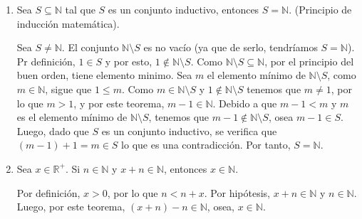 \documentclass[11pt]{article}
\newcommand{\N}{\mathbb{N}}
\newcommand{\R}{\mathbb{R}}
\let\subset\subseteq
\begin{document}
\begin{enumerate}[label=\alph*)]
\begin{enumerate}[label=\roman*)]

  \item Sea $S\subseteq \N$ tal que $S$ es un conjunto inductivo, entonces $S=\N$. (Principio de inducción matemática).

   Sea $S\neq \N$. El conjunto $\N\setminus S$ es no vacío (ya que de serlo, tendríamos $S=\N$). Pr definición, $1\in S$ y por esto, $1\notin \N\setminus S$. Como $\N\setminus S\subset \N$, por el principio del buen orden, tiene elemento minimo. Sea $m$ el elemento mínimo de $\N\setminus S$, como $m\in \N$, sigue que $1 \leq m$. Como $m\in \N\setminus S$ y $1\notin \N\setminus S$ tenemos que $m\neq 1$, por lo que $m>1$, y por este teorema, $m-1\in \N$. Debido a que $m-1<m$ y $m$ es el elemento mínimo de $\N \setminus S$, tenemos que $m-1\notin \N\setminus S$, osea $m-1\in S$. Luego, dado que $S$ es un conjunto inductivo, se verifica que $(m-1)+1=m\in S$ lo que es una contradicción. Por tanto, $S=\N$. 

  \item Sea $x\in \R^+$. Si $n\in \N$ y $x+n\in \N$, entonces $x\in \N$.

  Por definición, $x>0$, por lo que $n<n+x$. Por hipótesis, $x+n\in \N$ y $n\in \N$. Luego, por este teorema, $(x+n)-n \in \N$, osea, $x\in \N$.
 \end{enumerate} %

\end{enumerate}
\end{document}
